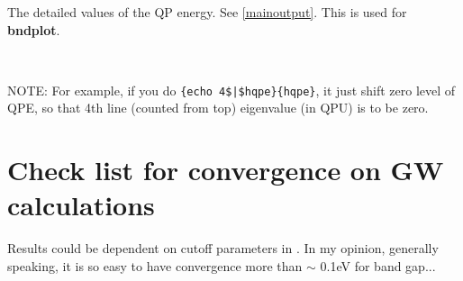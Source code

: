  The detailed values of the QP energy. See \ref{mainoutput}. 
           This is used for {\bf bndplot}.

 \

\noindent NOTE: For example, if you do \verb#{echo 4$|$hqpe}{hqpe}#, 
it just shift zero level of QPE, so that 4th line (counted from top) eigenvalue (in QPU) is to be zero.






\newpage
\section{Check list for convergence on GW calculations}
\label{checklist}
Results could be dependent on cutoff parameters in .
In my opinion, generally speaking, it is so easy 
to have convergence more than $\sim$ 0.1eV for band gap...

